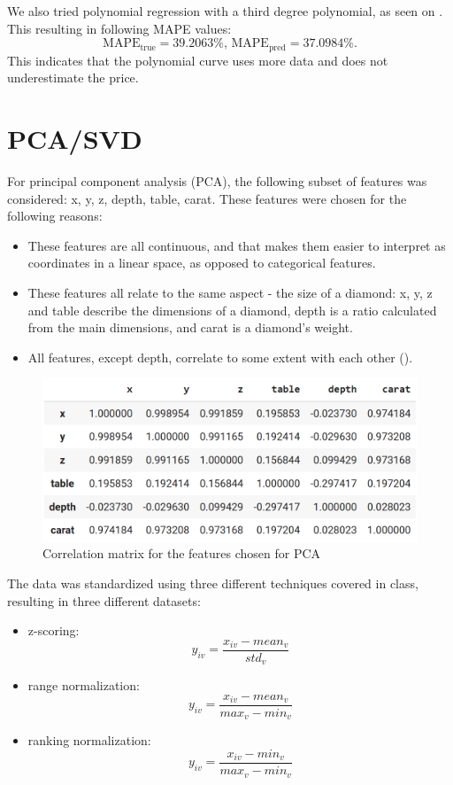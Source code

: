 \documentclass[12pt,a4paper]{article}
\begin{document}
	\newpage
	We also tried polynomial regression with a third degree polynomial, as seen on . This resulting in following MAPE values:
	\[\text{MAPE}_{\text{true}}= 39.2063\%,\, \text{MAPE}_{\text{pred}}=37.0984\%.\]
	This indicates that the polynomial curve uses more data and does not underestimate the price.
	
	\section{PCA/SVD}
	
	For principal component analysis (PCA), the following subset of features was considered: x, y, z, depth, table, carat. These features were chosen for the following reasons:
	\begin{itemize}
		\itemsep 0pt
		\item These features are all continuous, and that makes them easier to interpret as coordinates in a linear space, as opposed to categorical features.
		\item These features all relate to the same aspect - the size of a diamond: x, y, z and table describe the dimensions of a diamond, depth is a ratio calculated from the main dimensions, and carat is a diamond's weight.
		\item All features, except depth, correlate to some extent with each other ().
	\end{itemize}
	
	\begin{figure}[hbtp]
		\centering
		\includegraphics[width=.7\textwidth]{media/pcaCorr.png}
		\caption{Correlation matrix for the features chosen for PCA}
		\label{fig:pcaCorr}
	\end{figure}
	
	\newpage
	
	The data was standardized using three different techniques covered in class, resulting in three different datasets:
	\begin{itemize}
		\itemsep 0pt
		\item z-scoring:
		\[y_{iv} = \frac{x_{iv} - mean_v}{std_v} \]
		\item range normalization:
		\[y_{iv} = \frac{x_{iv} - mean_v}{max_v - min_v}\]
		\item ranking normalization:
		\[y_{iv} = \frac{x_{iv} - min_v}{max_v - min_v}\]
	\end{itemize}
	
\end{document}
